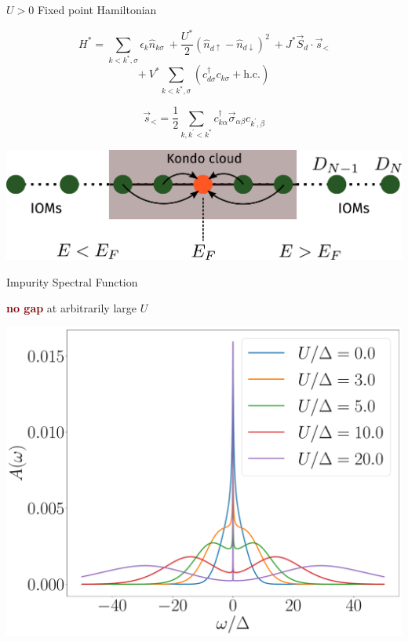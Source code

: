 \documentclass[aspectratio=169]{beamer}
\newcommand{\focus}[1]{\textcolor{maroon}{\textbf{#1}}}
\begin{document}
\begin{frame}[noframenumbering]{\(U > 0\) Fixed point Hamiltonian}
\begin{minipage}{0.48\textwidth}
	\[H^* = \sum_{k < k^*,\sigma}\epsilon_{k}\hat{n}_{k\sigma} ~ + \frac{U^*}{2}\left(\hat n_{d \uparrow} - \hat n_{d \downarrow}\right)^2 ~ + J^* \vec{S}_d\cdot \vec{s}_<\]
	\[+ ~ V^* \sum_{k < k^*,\sigma}\left(c^\dagger_{d\sigma}c_{k\sigma} + \text{h.c.}\right)\]

	\vspace*{20pt}
	\[\vec{s}_< = \frac{1}{2}\sum_{k,k^\prime < k^*}c^{\dagger}_{k\alpha}\vec{\sigma}_{\alpha\beta}c_{k^\prime,\beta}\]
\end{minipage}
\begin{minipage}{0.5\textwidth}
	\includegraphics[width=\textwidth]{figures/kondo_fp_1D.pdf}
\end{minipage}
\end{frame}

\begin{frame}[noframenumbering]{Impurity Spectral Function}
\centering
\hspace*{-15pt}
\begin{minipage}{0.25\textwidth}
\focus{no gap} at arbitrarily large $U$
\end{minipage}
\hspace*{25pt}
\begin{minipage}{0.7\textwidth}
\includegraphics[width=\textwidth]{./figures/gen_siam_spec_func.pdf}
\hspace*{-25pt}
\end{minipage}
\end{frame}
\end{document}
